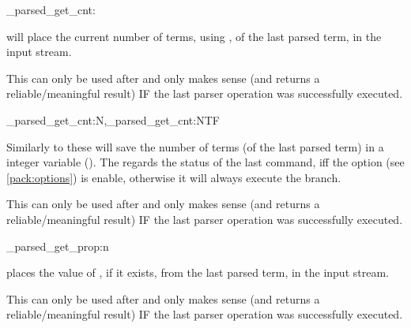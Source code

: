 \documentclass[10pt]{article}
\begin{document}
\begin{codedescribe}[code,EXP,new=2023/05/20]{\starray_parsed_get_cnt:}
\begin{codesyntax}%
\end{codesyntax}
 will place the current number of terms, using , of the last parsed term, in the input stream.
\end{codedescribe}
\begin{tsremark}
This can only be used after  and only makes sense (and returns a reliable/meaningful result) IF the last parser operation was successfully executed.
\end{tsremark}

\begin{codedescribe}[code,new=2025/10/25]{\starray_parsed_get_cnt:N,\starray_parsed_get_cnt:NTF}
\begin{codesyntax}%
\end{codesyntax}
Similarly to  these will save  the number of terms (of the last parsed term) in a integer variable (\cite{expl3}). The  regards the status of the last  command, iff the option  (see \ref{pack:options}) is enable, otherwise it will always execute the  branch.
\end{codedescribe}
\begin{tsremark}
This can only be used after  and only makes sense (and returns a reliable/meaningful result) IF the last parser operation was successfully executed.
\end{tsremark}




\begin{codedescribe}[code,EXP,new=2023/05/20]{\starray_parsed_get_prop:n}
\begin{codesyntax}%
\end{codesyntax}
 places the value of , if it exists, from the last parsed term, in the input stream. 
\end{codedescribe}
\begin{tsremark}
This can only be used after  and only makes sense (and returns a reliable/meaningful result) IF the last parser operation was successfully executed.
\end{tsremark}
\end{document}
